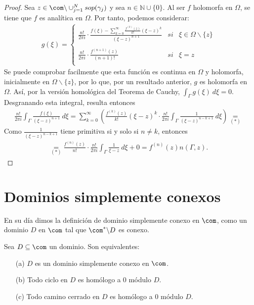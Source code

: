 \begin{proof}
Sea $z \in \com \backslash \cup_{j=1}^{N} sop(\gamma_j)$ y sea $n \in \mathbb{N} \cup \{0\}$. Al ser $f$ holomorfa en $\Omega$, se tiene que $f$ es analítica en $\Omega$. Por tanto, podemos considerar:
\begin{align*}
    g(\xi) = \left\{ \begin{array}{lcc}
             \frac{n!}{2\pi i} \cdot \frac{f(\xi) - \sum_{k=0}^{\infty} \frac{f^{(k)}(z)}{k!}(\xi - z)^k}{(\xi - z)^{n+1}} & si & \xi \in \Omega \backslash \{z\}\\
             \\ \frac{n!}{2\pi i} \cdot \frac{f^{(n+1)}(z)}{(n+1)!} &  si & \xi = z \\
             \end{array}
   \right.
\end{align*}
Se puede comprobar facilmente que esta función es continua en $\Omega$ y holomorfa, inicialmente en $\Omega \backslash \{z\}$, por lo que, por un resultado anterior, $g$ es holomorfa en $\Omega$. Así, por la versión homológica del Teorema de Cauchy, $\int_{\Gamma} g(\xi) \ d\xi = 0$. Desgranando esta integral, resulta entonces
\begin{align*}
    \frac{n!}{2\pi i} \int_{\Gamma} \frac{f(\xi)}{(\xi -z)^{n+1}} \ d\xi = \sum_{k=0}^{\infty} \left( \frac{f^{(k)}(z)}{k!}(\xi - z)^k \cdot \frac{n!}{2\pi i} \int_{\Gamma} \frac{1}{(\xi - z)^{n-k+1}} \ d\xi \right) \underset{(*)}{=}
\end{align*}
Como $\frac{1}{(\xi - z)^{n-k+1}}$ tiene primitiva si y solo si $n \not = k$, entonces
\begin{align*}
    \underset{(*)}{=} \frac{f^{(n)}(z)}{n!} \cdot \frac{n!}{2\pi i} \int_{\Gamma} \frac{1}{\xi -z} \ d\xi + 0 = f^{(n)}(z)n(\Gamma,z).
\end{align*}
\end{proof}

\section{Dominios simplemente conexos}
En su día dimos la definición de dominio simplemente conexo en $\com$, como un dominio $D$ en $\com$ tal que $\com^* \backslash D$ es conexo.

\begin{teo}
Sea $D \subseteq \com$ un dominio. Son equivalentes:
\begin{enumerate}
    \item[(a)] $D$ es un dominio simplemente conexo en $\com$.
    \item[(b)] Todo ciclo en $D$ es homólogo a 0 módulo $D$.
    \item[(c)] Todo camino cerrado en $D$ es homólogo a 0 módulo $D$.
\end{enumerate}
\end{teo}


